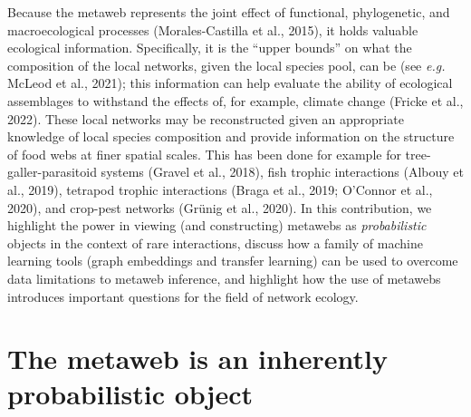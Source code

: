 \documentclass[10pt,oneside]{article}
\begin{document}
Because the metaweb represents the joint effect of functional,
phylogenetic, and macroecological processes (Morales-Castilla et al.,
2015), it holds valuable ecological information. Specifically, it is the
``upper bounds'' on what the composition of the local networks, given
the local species pool, can be (see \emph{e.g.} McLeod et al., 2021);
this information can help evaluate the ability of ecological assemblages
to withstand the effects of, for example, climate change (Fricke et al.,
2022). These local networks may be reconstructed given an appropriate
knowledge of local species composition and provide information on the
structure of food webs at finer spatial scales. This has been done for
example for tree-galler-parasitoid systems (Gravel et al., 2018), fish
trophic interactions (Albouy et al., 2019), tetrapod trophic
interactions (Braga et al., 2019; O'Connor et al., 2020), and crop-pest
networks (Grünig et al., 2020). In this contribution, we highlight the
power in viewing (and constructing) metawebs as \emph{probabilistic}
objects in the context of rare interactions, discuss how a family of
machine learning tools (graph embeddings and transfer learning) can be
used to overcome data limitations to metaweb inference, and highlight
how the use of metawebs introduces important questions for the field of
network ecology.

\hypertarget{the-metaweb-is-an-inherently-probabilistic-object}{%
\section{The metaweb is an inherently probabilistic
object}\label{the-metaweb-is-an-inherently-probabilistic-object}}
\end{document}
